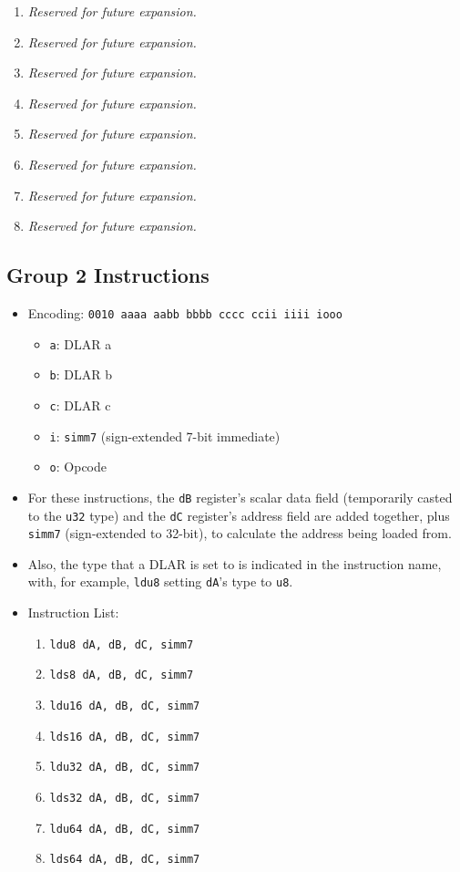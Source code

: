 \documentclass{article}
\begin{document}
\begin{itemize}
\begin{enumerate}
			\item \textit{Reserved for future expansion.}
			\item \textit{Reserved for future expansion.}
			\item \textit{Reserved for future expansion.}
			\item \textit{Reserved for future expansion.}

			\item \textit{Reserved for future expansion.}
			\item \textit{Reserved for future expansion.}
			\item \textit{Reserved for future expansion.}
			\item \textit{Reserved for future expansion.}
			\end{enumerate}
		\end{itemize}
		\newpage

	\subsection{Group 2 Instructions}
		\begin{itemize}
		\item Encoding: \texttt{0010 aaaa aabb bbbb  cccc ccii iiii iooo}
			\begin{itemize}
			\item \texttt{a}: DLAR a
			\item \texttt{b}: DLAR b
			\item \texttt{c}: DLAR c
			\item \texttt{i}: \texttt{simm7} (sign-extended 7-bit
				immediate)
			\item \texttt{o}: Opcode
			\end{itemize}
		\item For these instructions, the \texttt{dB} register's scalar
			data field (temporarily casted to the \texttt{u32} type) and
			the \texttt{dC} register's address field are added together,
			plus \texttt{simm7} (sign-extended to 32-bit), to calculate the
			address being loaded from.
		\item Also, the type that a DLAR is set to is indicated in the
			instruction name, with, for example, \texttt{ldu8} setting
			\texttt{dA}'s type to \texttt{u8}.
		\item Instruction List:
			\begin{enumerate}
			\item \texttt{ldu8 dA, dB, dC, simm7}
			\item \texttt{lds8 dA, dB, dC, simm7}
			\item \texttt{ldu16 dA, dB, dC, simm7}
			\item \texttt{lds16 dA, dB, dC, simm7}
			\item \texttt{ldu32 dA, dB, dC, simm7}
			\item \texttt{lds32 dA, dB, dC, simm7}
			\item \texttt{ldu64 dA, dB, dC, simm7}
			\item \texttt{lds64 dA, dB, dC, simm7}
			\end{enumerate}
		\end{itemize}
		\newpage
\end{document}
